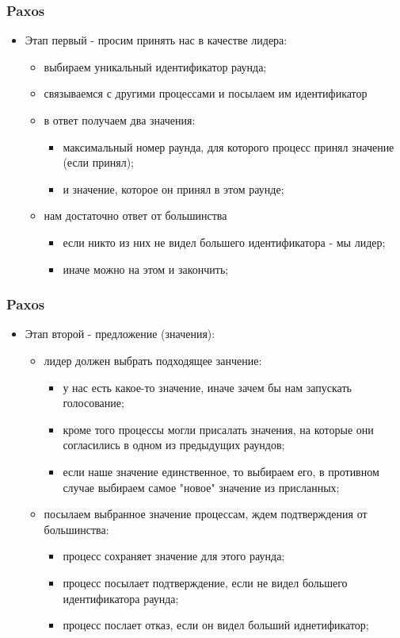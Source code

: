 \begin{frame}
\frametitle{Paxos}
\begin{itemize}
  \item Этап первый - просим принять нас в качестве лидера:
    \begin{itemize}
      \item выбираем уникальный идентификатор раунда;
      \item связываемся с другими процессами и посылаем им идентификатор
      \item в ответ получаем два значения:
        \begin{itemize}
          \item максимальный номер раунда, для которого процесс принял значение (если принял);
          \item и значение, которое он принял в этом раунде;
        \end{itemize}
      \item нам достаточно ответ от большинства
        \begin{itemize}
          \item если никто из них не видел большего идентификатора - мы лидер;
          \item иначе можно на этом и закончить;
        \end{itemize}
    \end{itemize}
\end{itemize}
\end{frame}

\begin{frame}
\frametitle{Paxos}
\begin{itemize}
  \item Этап второй - предложение (значения):
    \begin{itemize}
      \item лидер должен выбрать подходящее занчение:
        \begin{itemize}
          \item у нас есть какое-то значение, иначе зачем бы нам запускать голосование;
          \item кроме того процессы могли присалать значения, на которые они согласились в одном из предыдущих раундов;
          \item если наше значение единственное, то выбираем его, в противном случае выбираем самое "новое" значение из присланных;
        \end{itemize}
      \item посылаем выбранное значение процессам, ждем подтверждения от большинства:
        \begin{itemize}
          \item процесс сохраняет значение для этого раунда;
          \item процесс посылает подтверждение, если не видел большего идентификатора раунда;
          \item процесс послает отказ, если он видел больший иднетификатор;
        \end{itemize}
    \end{itemize}
\end{itemize}
\end{frame}

